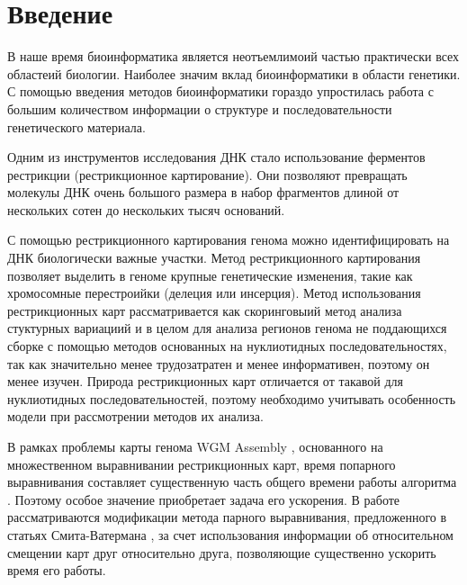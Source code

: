 \section*{Введение}
В наше время биоинформатика является неотъемлимоий частью практически всех областеий биологии. Наиболее значим вклад биоинформатики в области генетики. С помощью введения методов биоинформатики гораздо упростилась работа с большим количеством информации о структуре и последовательности генетического материала.

Одним из инструментов исследования ДНК стало использование ферментов рестрикции (рестрикционное картирование). Они позволяют превращать молекулы ДНК очень большого размера в набор фрагментов длиной от нескольких сотен до нескольких тысяч оснований.

С помощью рестрикционного картирования генома можно идентифицировать на ДНК биологически важные участки. Метод рестрикционного картирования позволяет выделить в геноме крупные генетические изменения, такие как хромосомные перестроийки (делеция или инсерция). Метод использования рестрикционных карт рассматривается как скоринговыий метод анализа стуктурных вариациий и в целом для анализа регионов генома не поддающихся сборке с помощью методов основанных на нуклиотидных последовательностях, так как значительно менее трудозатратен и менее информативен, поэтому он менее изучен.
Природа рестрикционных карт отличается от такавой для нуклиотидных последовательностей, поэтому необходимо учитывать особенность модели при рассмотрении методов их анализа.

В рамках проблемы карты генома WGM Assembly \cite{wgm}, основанного на множественном выравнивании рестрикционных карт, время попарного выравнивания составляет существенную часть общего времени работы алгоритма \cite{wgmassembly}. Поэтому особое значение приобретает задача его ускорения. В работе рассматриваются модификации метода парного выравнивания, предложенного в статьях Смита-Ватермана \cite{smith_water}, за счет использования информации об относительном смещении карт друг относительно друга, позволяющие существенно ускорить время его работы.
